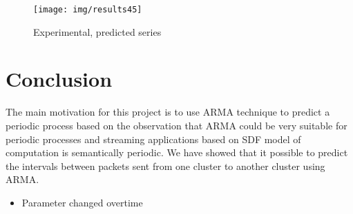 \documentclass[12pt]{article}
\begin{document}
\begin{figure}[ht!]
\centering
\texttt{[image: img/results45]}
\caption{Experimental, predicted series}\label{fig:results45}
\end{figure}

\section{Conclusion}
The main motivation for this project is to use ARMA technique to predict a
periodic process based on the observation that ARMA could be very suitable for
periodic processes and streaming applications based on SDF model of computation
is semantically periodic. We have showed that it possible to predict the
intervals between packets sent from one cluster to another cluster using ARMA. 

\begin{itemize}
  \item Parameter changed overtime
\end{itemize}



\end{document}

